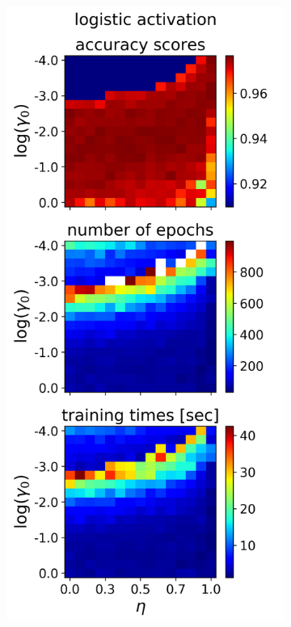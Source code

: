 \documentclass[nofootinbib,reprint,english]{revtex4-1}
\begin{document}
\clearpage
~
\begin{figure}[h!]
\centering
	\begin{subfigure}{0.32\textwidth}
	\centering
	\includegraphics[scale=0.38]{../results/NN/img/gridsearch2_logistic2.png}

\end{subfigure}
\end{figure}
\end{document}
